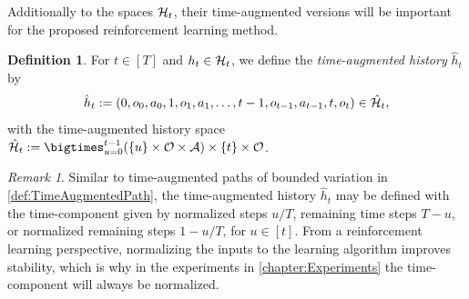 \documentclass[
    a4paper,
    11pt,
    bibliography=totoc,
    listof=totoc,      
    headinclude=true,
    cleardoublepage=empty,
]{scrbook}
\theoremstyle{plain}
\theoremstyle{definition}
\newtheorem{definition}[theorem]{Definition}
\theoremstyle{remark}
\newtheorem{remark}[theorem]{Remark}
\newcommand{\SpaceA}{{\cal A}}
\newcommand{\SpaceO}{{\cal O}}
\newcommand{\SpaceH}{{\cal H}}
\begin{document}
Additionally to the spaces $\SpaceH_t$, their time-augmented versions will be 
important for the proposed reinforcement learning method.

\begin{definition}
\label{def:TimeAugmentedHistorySpaces}
    For $t\in[T]$ and $h_t\in\SpaceH_t$, we define the \textit{time-augmented
    history} $\hat{h}_t$ by
    \begin{equation}
    \label{eq:TimeAugmentedHistory}
        \hat{h}_t  
        := (0, o_0, a_0, 1, o_1, a_1, \dots, t-1, o_{t-1}, a_{t-1}, t, o_t)
        \in\hat\SpaceH_t,
    \end{equation}
    with the time-augmented history space 
    $\hat{\SpaceH}_t := \bigtimes_{u=0}^{t-1} 
    (\{u\}\times\SpaceO\times\SpaceA)\times\{t\}\times\SpaceO$.
\end{definition}

\begin{remark}
    Similar to time-augmented paths of bounded variation in
    \cref{def:TimeAugmentedPath}, the time-augmented history $\hat{h}_t$ may
    be defined with the time-component given by normalized steps $u/T$, 
    remaining time steps $T-u$, or normalized remaining steps $1-u/T$, for 
    $u\in[t]$. From a reinforcement learning perspective, normalizing the 
    inputs to the learning algorithm improves stability, which is why in the 
    experiments in \cref{chapter:Experiments} the time-component will always 
    be normalized.
\end{remark}
\end{document}
